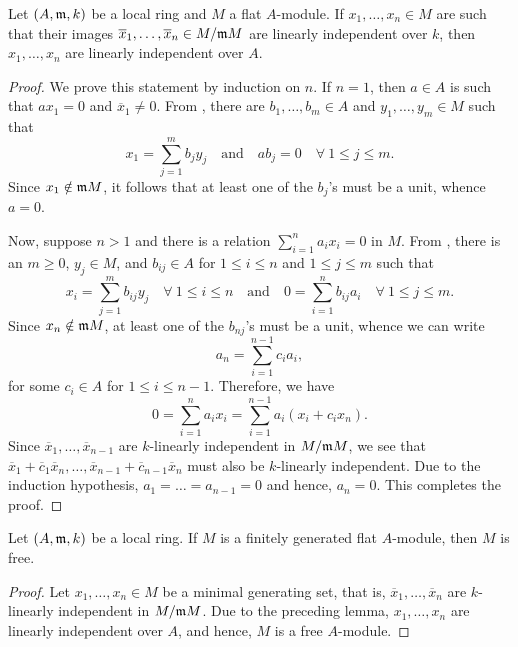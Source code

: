 \begin{lemma}
    Let $(A,\mathfrak{m}, k)$ be a local ring and $M$ a flat $A$-module. If $x_1,\dots,x_n\in M$ are such that their images $\overline x_1,\dots,\overline x_n\in M/\mathfrak{m} M$ are linearly independent over $k$, then $x_1,\dots,x_n$ are linearly independent over $A$.
\end{lemma}
\begin{proof}
    We prove this statement by induction on $n$. If $n = 1$, then $a\in A$ is such that $ax_1 = 0$ and $\overline x_1\ne 0$. From , there are $b_1,\dots,b_m\in A$ and $y_1,\dots, y_m\in M$ such that 
    \begin{equation*}
        x_1 = \sum_{j = 1}^m b_jy_j\quad\text{and}\quad ab_j = 0\quad\forall~1\le j\le m.
    \end{equation*}
    Since $x_1\notin\mathfrak{m} M$, it follows that at least one of the $b_j$'s must be a unit, whence $a = 0$.

    Now, suppose $n > 1$ and there is a relation $\sum_{i = 1}^n a_ix_i = 0$ in $M$. From , there is an $m\ge 0$, $y_j\in M$, and $b_{ij}\in A$ for $1\le i\le n$ and $1\le j\le m$ such that 
    \begin{equation*}
        x_i = \sum_{j = 1}^m b_{ij}y_j\quad\forall~1\le i\le n\quad\text{and}\quad 0 = \sum_{i = 1}^n b_{ij}a_i\quad\forall~1\le j\le m.
    \end{equation*}
    Since $x_n\notin\mathfrak{m} M$, at least one of the $b_{nj}$'s must be a unit, whence we can write 
    \begin{equation*}
        a_n = \sum_{i = 1}^{n - 1}c_ia_i,
    \end{equation*}
    for some $c_i\in A$ for $1\le i\le n - 1$. Therefore, we have 
    \begin{equation*}
        0 = \sum_{i = 1}^n a_ix_i = \sum_{i = 1}^{n - 1}a_i(x_i + c_ix_n).
    \end{equation*}
    Since $\overline x_1,\dots,\overline x_{n - 1}$ are $k$-linearly independent in $M/\mathfrak{m} M$, we see that $\overline x_1 + \overline c_1\overline x_n,\dots,\overline x_{n - 1} + \overline c_{n - 1}\overline x_n$ must also be $k$-linearly independent. Due to the induction hypothesis, $a_1 = \dots = a_{n - 1} = 0$ and hence, $a_n = 0$. This completes the proof.
\end{proof}

\begin{theorem}
    Let $(A,\mathfrak{m}, k)$ be a local ring. If $M$ is a finitely generated flat $A$-module, then $M$ is free.
\end{theorem}
\begin{proof}
    Let $x_1,\dots,x_n\in M$ be a minimal generating set, that is, $\overline x_1,\dots,\overline x_n$ are $k$-linearly independent in $M/\mathfrak{m} M$. Due to the preceding lemma, $x_1,\dots,x_n$ are linearly independent over $A$, and hence, $M$ is a free $A$-module.
\end{proof}

